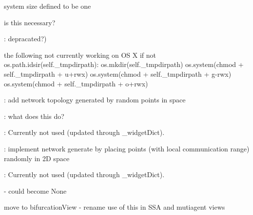 \begin{DoxyRefList}
system size defined to be one  
\item[\label{todo__todo000012}%
\Hypertarget{todo__todo000012}%
Global \hyperlink{class_mu_mo_t_1_1_mu_mo_tmodel_a8ef9f9e4473f46043da1484716b18268}{Mu\+Mo\+Tmodel.\+\_\+funcs} ]is this necessary?  
\item[\label{todo__todo000002}%
\Hypertarget{todo__todo000002}%
Global \hyperlink{class_mu_mo_t_1_1_mu_mo_tmodel_accfd4bbcd94ec3ce4a064fec53921700}{Mu\+Mo\+Tmodel.\+\_\+reactants\+La\+TeX} ]\+: depracated?)  
\item[\label{todo__todo000016}%
\Hypertarget{todo__todo000016}%
Global \hyperlink{class_mu_mo_t_1_1_mu_mo_tmodel_ad2feb50403a36ab7c591c04e0cf33cc4}{Mu\+Mo\+Tmodel.\+\_\+tmpdir} ]the following not currently working on OS X if not os.\+path.\+idsir(self.\+\_\+tmpdirpath)\+: os.\+mkdir(self.\+\_\+tmpdirpath) os.\+system(\textquotesingle{}chmod\textquotesingle{} + self.\+\_\+tmpdirpath + \textquotesingle{}u+rwx\textquotesingle{}) os.\+system(\textquotesingle{}chmod\textquotesingle{} + self.\+\_\+tmpdirpath + \textquotesingle{}g-\/rwx\textquotesingle{}) os.\+system(\textquotesingle{}chmod\textquotesingle{} + self.\+\_\+tmpdirpath + \textquotesingle{}o+rwx\textquotesingle{})  
\item[\label{todo__todo000020}%
\Hypertarget{todo__todo000020}%
Global \hyperlink{class_mu_mo_t_1_1_mu_mo_tmultiagent_controller_a018864aa22d2adb0d3958fb0adbce8e2}{Mu\+Mo\+Tmultiagent\+Controller.\+\_\+progress\+Bar} ]\+: add network topology generated by random points in space  
\item[\label{todo__todo000001}%
\Hypertarget{todo__todo000001}%
Class \hyperlink{class_mu_mo_t_1_1_mu_mo_tmultiagent_view}{Mu\+Mo\+Tmultiagent\+View} ]\+: what does this do?  
\item[\label{todo__todo000041}%
\Hypertarget{todo__todo000041}%
Global \hyperlink{class_mu_mo_t_1_1_mu_mo_tmultiagent_view_a5feff4ca83ee97d6e09874496a4975d4}{Mu\+Mo\+Tmultiagent\+View.\+\_\+plot\+Type} ]\+: Currently not used (updated through \+\_\+widget\+Dict). 
\item[\label{todo__todo000043}%
\Hypertarget{todo__todo000043}%
Global \hyperlink{class_mu_mo_t_1_1_mu_mo_tmultiagent_view_a8be9986760a86837e04718906d18d596}{Mu\+Mo\+Tmultiagent\+View.\+\_\+positions} ]\+: implement network generate by placing points (with local communication range) randomly in 2D space  
\item[\label{todo__todo000044}%
\Hypertarget{todo__todo000044}%
Global \hyperlink{class_mu_mo_t_1_1_mu_mo_t_s_s_a_view_a5feff4ca83ee97d6e09874496a4975d4}{Mu\+Mo\+T\+S\+S\+A\+View.\+\_\+plot\+Type} ]\+: Currently not used (updated through \+\_\+widget\+Dict). 
\item[\label{todo__todo000022}%
\Hypertarget{todo__todo000022}%
Global \hyperlink{class_mu_mo_t_1_1_mu_mo_tview_a15f56ca9811d1e67d721fa64f9b0dc1e}{Mu\+Mo\+Tview.\+\_\+controller} ]-\/ could become None  
\item[\label{todo__todo000023}%
\Hypertarget{todo__todo000023}%
Global \hyperlink{class_mu_mo_t_1_1_mu_mo_tview_a5feff4ca83ee97d6e09874496a4975d4}{Mu\+Mo\+Tview.\+\_\+plot\+Type} ]move to bifurcation\+View -\/ rename use of this in S\+SA and mutiagent views 
\end{DoxyRefList}